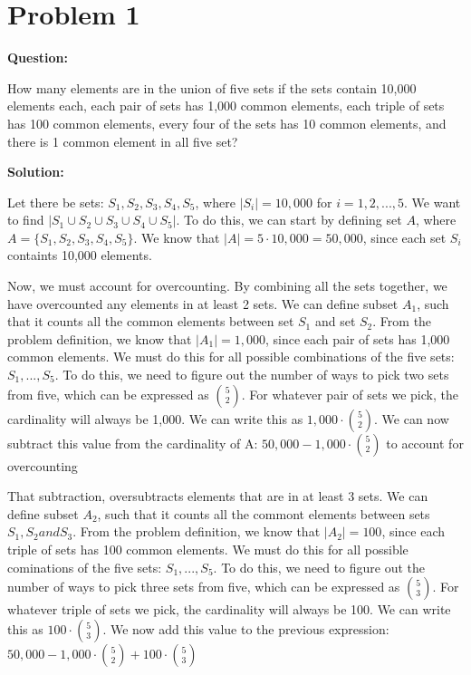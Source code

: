 \documentclass[11pt]{article}
\begin{document}
\section*{Problem 1}

\textbf{Question:}

How many elements are in the union of five sets if the sets contain 10,000 elements each, each pair of sets has 1,000 common elements, each triple of sets has 100 common elements, every four of the sets has 10 common elements, and there is 1 common element in all five set?

\textbf{Solution:}

Let there be sets: $S_1, S_2, S_3, S_4, S_5$, where $|S_i| = 10,000$ for $i = 1, 2, ..., 5$. We want to find $|S_1 \cup S_2 \cup S_3 \cup S_4 \cup S_5|$. To do this, we can start by defining set $A$, where $A = \{S_1, S_2, S_3, S_4, S_5\}$. We know that $|A| = 5 \cdot 10,000 = 50,000$, since each set $S_i$ containts 10,000 elements.

Now, we must account for overcounting. By combining all the sets together, we have overcounted any elements in at least 2 sets. We can define subset $A_1$, such that it counts all the common elements between set $S_1$ and set $S_2$. From the problem definition, we know that $|A_1| = 1,000$, since each pair of sets has 1,000 common elements. We must do this for all possible combinations of the five sets: $S_1, ..., S_5$. To do this, we need to figure out the number of ways to pick two sets from five, which can be expressed as $\binom{5}{2}$. For whatever pair of sets we pick, the cardinality will always be 1,000. We can write this as $1,000 \cdot \binom{5}{2}$. We can now subtract this value from the cardinality of A: $50,000 - 1,000 \cdot \binom{5}{2}$ to account for overcounting

That subtraction, oversubtracts elements that are in at least 3 sets. We can define subset $A_2$, such that it counts all the commont elements between sets $S_1, S_2 and S_3$. From the problem definition, we know that $|A_2| = 100$, since each triple of sets has 100 common elements. We must do this for all possible cominations of the five sets: $S_1, ..., S_5$. To do this, we need to figure out the number of ways to pick three sets from five, which can be expressed as $\binom{5}{3}$. For whatever triple of sets we pick, the cardinality will always be 100. We can write this as $100 \cdot \binom{5}{3}$. We now add this value to the previous expression: $50,000 - 1,000 \cdot \binom{5}{2} + 100 \cdot \binom{5}{3}$
\end{document}
